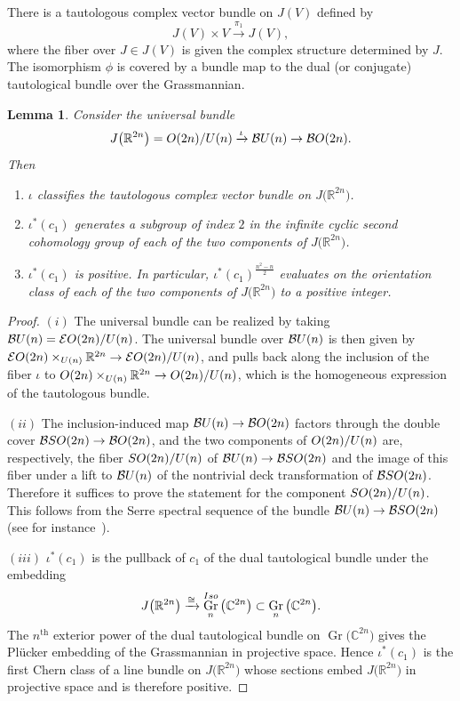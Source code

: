 \documentclass[11pt]{article}
\numberwithin{equation}{section}
\newcommand{\R}{\mathbb{R}}
\newcommand{\C}{\mathbb{C}}
\DeclareMathOperator{\Gr}{Gr}
\numberwithin{equation}{section}
\newtheorem{Lemma}[Theorem]{Lemma}
\begin{document}
There is a tautologous complex vector bundle on $J(V)$ defined by
\[J(V) \times V \xrightarrow{\pi_1} J(V),\]
where the fiber over $J\in J(V)$ is given the complex structure determined by $J$.
The isomorphism $\phi$ is covered by a bundle map to the dual (or conjugate) tautological bundle over the Grassmannian.

\begin{Lemma}\label{positchern}
Consider the universal bundle
\[
J\big(\R^{2n}\big)={\rm O}(2n)/{\rm U}(n) \xrightarrow{\iota} {\mathcal B}{\rm U}(n) \to {\mathcal B}{\rm O}(2n).
\]
Then
\begin{enumerate}\itemsep=0pt
\item[$(i)$] $\iota$ classifies the tautologous complex vector bundle on $J\big(\R^{2n}\big)$.
\item[$(ii)$] $\iota^*(c_1)$ generates a subgroup of index $2$ in the infinite cyclic second cohomology group of
each of the two components of $J\big(\R^{2n}\big)$.
\item[$(iii)$] $\iota^*(c_1)$ is positive. In particular, $\iota^*(c_1)^{\frac{n^2-n}{2}}$ evaluates on the orientation class of each of the two components of $J\big(\R^{2n}\big)$ to a positive integer.
\end{enumerate}
\end{Lemma}
\begin{proof}
$(i)$ The universal bundle can be realized by taking ${\mathcal B}{\rm U}(n)={\mathcal E}{\rm O}(2n)/{\rm U}(n)$. The universal bundle over ${\mathcal B}{\rm U}(n)$ is then given by ${\mathcal E}{\rm O}(2n)\times_{{\rm U}(n)} \R^{2n} \to {\mathcal E}{\rm O}(2n)/{\rm U}(n)$, and pulls back along the inclusion of the fiber $\iota$ to ${\rm O}(2n) \times_{{\rm U}(n)} \R^{2n} \to {\rm O}(2n)/{\rm U}(n)$, which is the homogeneous expression of the tautologous bundle.

$(ii)$ The inclusion-induced map ${\mathcal B}{\rm U}(n) \to {\mathcal B}{\rm O}(2n)$ factors through the
double cover ${\mathcal B}{\rm SO}(2n) \allowbreak \to {\mathcal B}{\rm O}(2n)$, and the two components of ${\rm O}(2n)/{\rm U}(n)$ are,
respectively, the fiber ${\rm SO}(2n)/{\rm U}(n)$ of ${\mathcal B}{\rm U}(n) \to {\mathcal B}{\rm SO}(2n)$ and the image
of this fiber under a lift to ${\mathcal B}{\rm U}(n)$ of the nontrivial deck transformation of
${\mathcal B}{\rm SO}(2n)$. Therefore it suffices to prove the statement for the component
${\rm SO}(2n)/{\rm U}(n)$. This follows from the Serre spectral sequence of the bundle
${\mathcal B}{\rm U}(n) \to {\mathcal B}{\rm SO}(2n)$ (see for instance~\cite[Theorem~III.6.11]{MiTo}).

$(iii)$ $\iota^*(c_1)$ is the pullback of $c_1$ of the dual tautological bundle under the embedding
\[J\big(\R^{2n}\big) \xrightarrow{\cong} \Gr_n^{\rm Iso}\big(\C^{2n}\big) \subset \Gr_n\big(\C^{2n}\big).\]
The $n^{\mathrm{th}}$ exterior power of the dual tautological bundle on $\Gr\big(\C^{2n}\big)$ gives the
Pl\"ucker embedding of the Grassmannian in projective space. Hence $\iota^*(c_1)$ is the first
Chern class of a line bundle on $J\big(\R^{2n}\big)$ whose sections embed $J\big(\R^{2n}\big)$ in projective space and is therefore positive.\qedhere
\end{proof}
\end{document}
